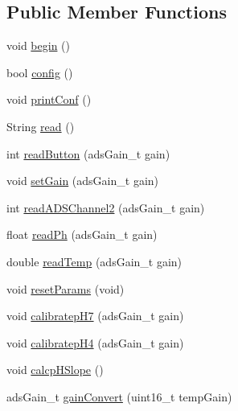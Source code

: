 \subsection*{Public Member Functions}
\begin{DoxyCompactItemize}
\item 
void \hyperlink{classIrene3000_ad5891806c500ae1007afe52b9e304c2b}{begin} ()
\item 
bool \hyperlink{classIrene3000_afed5c35e4b23963c157847ef27c11e9c}{config} ()
\item 
void \hyperlink{classIrene3000_a7bc2414100b5e19eacc6630fa34b2654}{print\+Conf} ()
\item 
String \hyperlink{classIrene3000_a852a170feea994ea1df01c6b245b5d9a}{read} ()
\item 
int \hyperlink{classIrene3000_ae0e0a5b773c3625b44c1d113c76a1540}{read\+Button} (ads\+Gain\+\_\+t gain)
\item 
void \hyperlink{classIrene3000_aff7c5da186b388e7272e63ff88a20c34}{set\+Gain} (ads\+Gain\+\_\+t gain)
\item 
int \hyperlink{classIrene3000_ae73bd2ed14a199a7e83f4d6458476a7c}{read\+A\+D\+S\+Channel2} (ads\+Gain\+\_\+t gain)
\item 
float \hyperlink{classIrene3000_abf3db725fabb0634ec889b32068a5eec}{read\+Ph} (ads\+Gain\+\_\+t gain)
\item 
double \hyperlink{classIrene3000_a94ad40f281d83ad1be20bf1edd6fe802}{read\+Temp} (ads\+Gain\+\_\+t gain)
\item 
void \hyperlink{classIrene3000_a0fba280e8b7c881307efa31281aa691d}{reset\+Params} (void)
\item 
void \hyperlink{classIrene3000_a2e810ddfa8b95eaa2446a408761c6bdc}{calibratep\+H7} (ads\+Gain\+\_\+t gain)
\item 
void \hyperlink{classIrene3000_a9772eeea2305fad6236a82e33e93892e}{calibratep\+H4} (ads\+Gain\+\_\+t gain)
\item 
void \hyperlink{classIrene3000_a81f6a79e546679692053f7ac1af49613}{calcp\+H\+Slope} ()
\item 
ads\+Gain\+\_\+t \hyperlink{classIrene3000_abcad62d1201a59f8dd3ba87048002728}{gain\+Convert} (uint16\+\_\+t temp\+Gain)
\end{DoxyCompactItemize}
